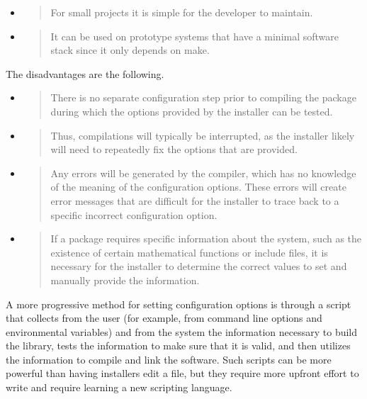 \documentclass[]{article}
\begin{document}
\begin{itemize}
\item
  \begin{quote}
  For small projects it is simple for the developer to maintain.
  \end{quote}
\item
  \begin{quote}
  It can be used on prototype systems that have a minimal software stack
  since it only depends on make.
  \end{quote}
\end{itemize}

The disadvantages are the following.

\begin{itemize}
\item
  \begin{quote}
  There is no separate configuration step prior to compiling the package
  during which the options provided by the installer can be tested.
  \end{quote}
\item
  \begin{quote}
  Thus, compilations will typically be interrupted, as the installer
  likely will need to repeatedly fix the options that are provided.
  \end{quote}
\item
  \begin{quote}
  Any errors will be generated by the compiler, which has no knowledge
  of the meaning of the configuration options. These errors will create
  error messages that are difficult for the installer to trace back to a
  specific incorrect configuration option.
  \end{quote}
\item
  \begin{quote}
  If a package requires specific information about the system, such as
  the existence of certain mathematical functions or include files, it
  is necessary for the installer to determine the correct values to set
  and manually provide the information.
  \end{quote}
\end{itemize}

A more progressive method for setting configuration options is through a
script that collects from the user (for example, from command line
options and environmental variables) and from the system the information
necessary to build the library, tests the information to make sure that
it is valid, and then utilizes the information to compile and link the
software. Such scripts can be more powerful than having installers edit
a file, but they require more upfront effort to write and require
learning a new scripting language.
\end{document}
